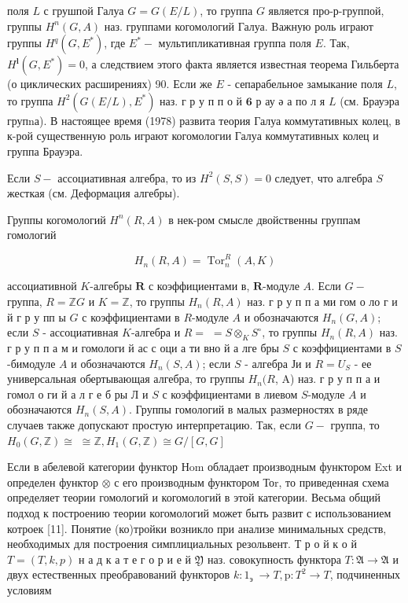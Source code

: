 \documentclass[10pt]{article}
\begin{document}
поля $L$ с грушпой Галуа $G=G(E / L)$, то группа $G$ является про-р-группой, группы $H^{n}(G, A)$ наз. группами когомологий Галуа. Важную роль играют группы $H^{q}\left(G, E^{*}\right)$, где $E^{*}-$ мультипликативная группа поля $E$. Так, $H^{\mathbf{l}}\left(G, E^{*}\right)=0$, а следствием этого факта является известная теорема Гильберта (о циклических расширениях) 90. Если же $E$ - сепарабельное замыкание поля $L$, то группа $H^{2}\left(G(E / L), E^{*}\right)$ наз. г р у п п о й $\mathbf{6}$ р ау ә а по л я $L$ (см. Брауэра групnа). В настоящее время (1978) развита теория Галуа коммутативных колец, в к-рой существенную роль играют когомологии Галуа коммутативных колец и группа Брауэра.



Если $S-$ ассоциативная алгебра, то из $H^{2}(S, S)=0$ следует, что алгебра $S$ жесткая (см. Деформация алгебры).



Группы когомологий $H^{n}(R, A)$ в нек-ром смысле двойственны группам гомологий



\[

H_{n}(R, A)=\operatorname{Tor}_{n}^{R}(A, K)

\]



ассоциативной $K$-алгебры $\boldsymbol{R}$ с коэффициентами в, $\boldsymbol{R}$-модуле $A$. Если $G-$ группа, $R=\mathbb{Z} G$ и $K=\mathbb{Z}$, то группы $H_{n}(R, A)$ наз. г р у п п а ми гом о ло г и й г р у пп ы $G$ с коэффициентами в $R$-модуле $A$ и обозначаются $H_{n}(G, A)$; если $S$ - ассоциативная $K$-алгебра и $R=$ $=S \otimes_{K} S^{\circ}$, то группы $H_{n}(R, A)$ наз. г р у п п а м и гомологи й ас с оци а ти вно й а лге бры $S$ с коэффициентами в $S$-бимодуле $A$ и обозначаются $H_{n}(S, A)$; если $S$ - алгебра Ји и $R=U_{S}$ - ее универсальная обертывающая алгебра, то группы $H_{n}(R$, A) наз. г р у п п а и гомол о ги й а л г е б ры Л и $S$ с коэффициентами в лиевом $S$-модуле $A$ и обозначаются $H_{n}(S, A)$. Группы гомологий в малых размерностях в ряде случаев также допускают простую интерпретацию. Так, если $G-$ группа, то $H_{0}(G, \mathbb{Z}) \cong$ $\cong \mathbb{Z}, H_{1}(G, \mathbb{Z}) \cong G /[G, G]$



Если в абелевой категории функтор Нom обладает производным функтором Ext и определен функтор $\otimes$ с его производным функтором Тоr, то приведенная схема определяет теории гомологий и когомологий в этой категории. Весьма общий подход к построению теории когомологий может быть развит с использованием котроек [11]. Понятие (ко)тройки возникло при анализе минимальных средств, необходимых для построения симплициальных резольвент. Т р о й к о й $T=(T, k, p)$ н а д к а т е г о р и е й $\mathfrak{Y}$ наз. совокупность функтора $T: \mathfrak{A} \rightarrow \mathfrak{A}$ и двух естественных преобравований функторов $k: 1_{\text {э }} \rightarrow T, \mathrm{p}: T^{2} \rightarrow T$, подчиненных условиям
\end{document}
